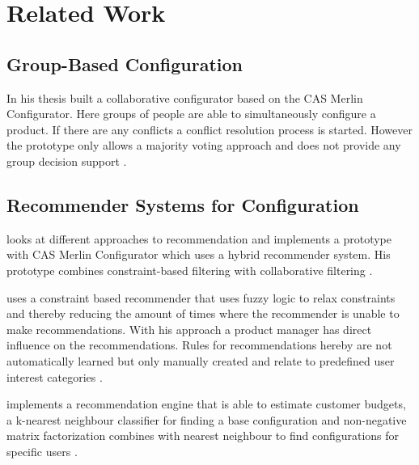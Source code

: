 \chapter{Related Work}
\label{ch:Related_Work}

\section{Group-Based Configuration}
\label{sec:Related_Work:GroupBasedConfiguration}

In his thesis \citeauthor{raabKollaborativeProduktkonfigurationEchtzeit2019} built a collaborative configurator based on the CAS Merlin Configurator. Here groups of people are able to simultaneously configure a product. If there are any conflicts a conflict resolution process is started. However the prototype only allows a majority voting approach and does not provide any group decision support \cite{raabKollaborativeProduktkonfigurationEchtzeit2019}.

\section{Recommender Systems for Configuration}
\label{sec:Related_Work:RecommenderSystemsForGonfiguration}

\citeauthor{rubinshteynEntwicklungHybridenRecommender2018} looks at different approaches to recommendation and implements a prototype with CAS Merlin Configurator which uses a hybrid recommender system. His prototype combines constraint-based filtering with collaborative filtering \cite{rubinshteynEntwicklungHybridenRecommender2018}.

\citeauthor{benzMoeglichkeitenIntelligenterEmpfehlungssysteme2017} uses a constraint based recommender that uses fuzzy logic to relax constraints and thereby reducing the amount of times where the recommender is unable to make recommendations. With his approach a product manager has direct influence on the recommendations. Rules for recommendations hereby are not automatically learned but only manually created and relate to predefined user interest categories \cite{benzMoeglichkeitenIntelligenterEmpfehlungssysteme2017}.

\citeauthor{ullmannEntwurfUndUmsetzung2017} implements a recommendation engine that is able to estimate customer budgets, a k-nearest neighbour classifier for finding a base configuration and non-negative matrix factorization combines with nearest neighbour to find configurations for specific users \cite{ullmannEntwurfUndUmsetzung2017}.

